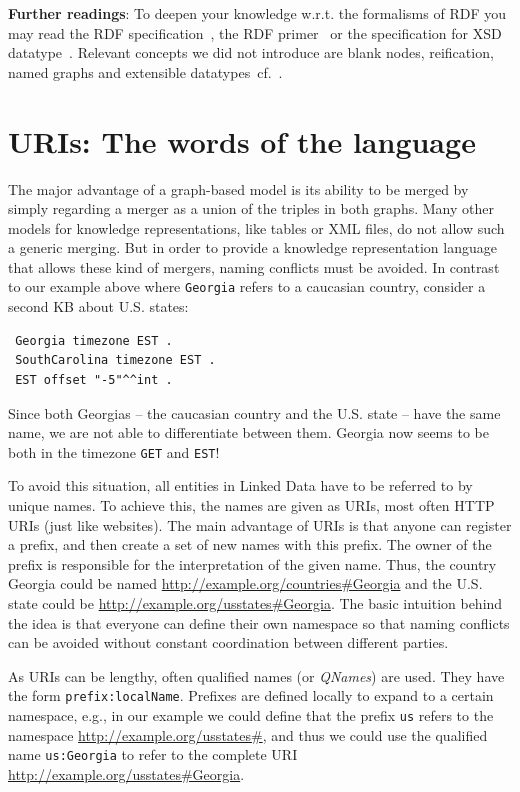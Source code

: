 \medskip

\textbf{Further readings}:
To deepen your knowledge w.r.t. the formalisms of \ac{RDF} you may read the \ac{RDF} specification~\cite{rdf-spec}, 
the \ac{RDF} primer~\cite{rdfprimer} or 
the specification for XSD datatype~\cite{xsd-part2}.
Relevant concepts we did not introduce are blank nodes, reification, named graphs and extensible datatypes~cf.~\cite{namedgraphs,rdfprimer}.

\section{URIs: The words of the language}
\label{uri}

The major advantage of a graph-based model is its ability to be merged by simply regarding a merger as a union of the triples in both graphs.
Many other models for knowledge representations, like tables or XML files, do not allow such a generic merging.
But in order to provide a knowledge representation language that allows these kind of mergers, naming conflicts must be avoided.
In contrast to our example above where \texttt{Georgia} refers to a caucasian country, consider a second \ac{KB} about U.S. states:

\begin{verbatim}
 Georgia timezone EST .
 SouthCarolina timezone EST .
 EST offset "-5"^^int .
\end{verbatim}

Since both Georgias -- the caucasian country and the U.S. state -- have the same name, we are not able to differentiate between them.
Georgia now seems to be both in the timezone \texttt{GET} and \texttt{EST}!

To avoid this situation, all entities in Linked Data have to be referred to by unique names.
To achieve this, the names are given as URIs, most often HTTP URIs (just like websites).
The main advantage of URIs is that anyone can register a prefix, and then create a set of new names with this prefix.
The owner of the prefix is responsible for the interpretation of the given name.
Thus, the country Georgia could be named \url{http://example.org/countries\#Georgia} and the U.S. state could be \url{http://example.org/usstates\#Georgia}.
The basic intuition behind the idea is that everyone can define their own namespace so that naming conflicts can be avoided without constant coordination between different parties.

As URIs can be lengthy, often qualified names (or \textit{QNames}) are used.
They have the form \texttt{prefix:localName}.
Prefixes are defined locally to expand to a certain namespace, e.g., in our example we could define that the prefix \texttt{us} refers to the namespace \url{http://example.org/usstates\#}, and thus we could use the qualified name \texttt{us:Georgia} to refer to the complete URI \url{http://example.org/usstates\#Georgia}.

